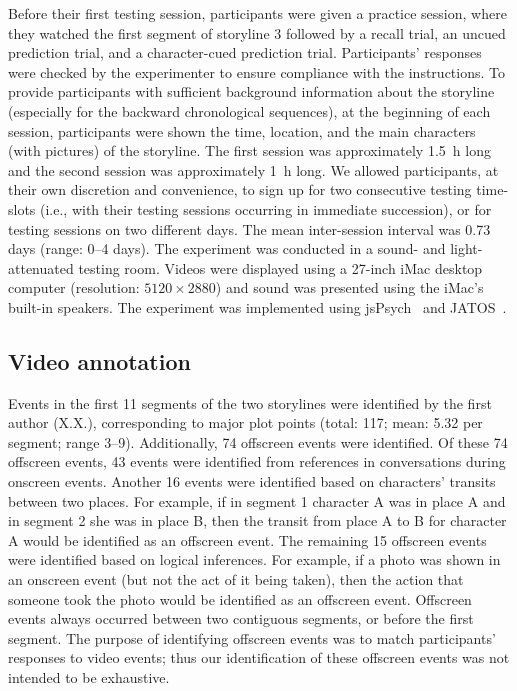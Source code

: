 \documentclass[10pt]{article}
\begin{document}
Before their first testing session, participants were given a practice session, where they watched the first segment of storyline 3 followed by a recall trial, an uncued prediction trial, and a character-cued prediction trial. Participants' responses were checked by the experimenter to ensure compliance with the instructions. To provide participants with sufficient background information about the storyline (especially for the backward chronological sequences), at the beginning of each session, participants were shown the time, location, and the main characters (with pictures) of the storyline. The first session was approximately 1.5~h long and the second session was approximately 1~h long. We allowed participants, at their own discretion and convenience, to sign up for two consecutive testing time-slots (i.e., with their testing sessions occurring in immediate succession), or for testing sessions on two different days. The mean inter-session interval was 0.73 days (range: 0--4 days). The experiment was conducted in a sound- and light-attenuated testing room. Videos were displayed using a 27-inch iMac desktop computer (resolution: $5120 \times 2880$) and sound was presented using the iMac’s built-in speakers. The experiment was implemented using jsPsych~\citep{deLe15} and JATOS~\citep{LangEtal15}.

\subsection*{Video annotation}
Events in the first 11 segments of the two storylines were identified by the first author (X.X.), corresponding to major plot points (total: 117; mean: 5.32 per segment; range 3--9). Additionally, 74 offscreen events were identified. Of these 74 offscreen events, 43 events were identified from references in conversations during onscreen events. Another 16 events were identified based on characters’ transits between two places.  For example, if in segment 1 character A was in place A and in segment 2 she was in place B, then the transit from place A to B for character A would be identified as an offscreen event. The remaining 15 offscreen events were identified based on logical inferences.  For example, if a photo was shown in an onscreen event (but not the act of it being taken), then the action that someone took the photo would be identified as an offscreen event.  Offscreen events always occurred between two contiguous segments, or before the first segment. The purpose of identifying offscreen events was to match participants’ responses to video events; thus our identification of these offscreen events was not intended to be exhaustive.
\end{document}
